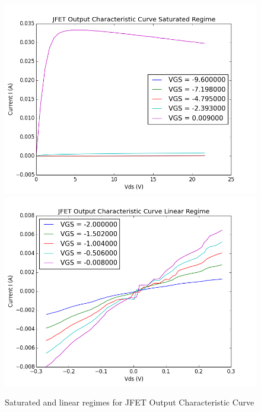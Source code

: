 \documentclass{article}
\begin{document}
    \begin{figure}[H]
        \centering
        \includegraphics[scale = 0.5]{4_5sat.png}
        \includegraphics[scale = 0.5]{4_5lin.png}
        \caption{Saturated and linear regimes for JFET Output Characteristic Curve}
        \label{fig:my_label}
    \end{figure}
\end{document}
